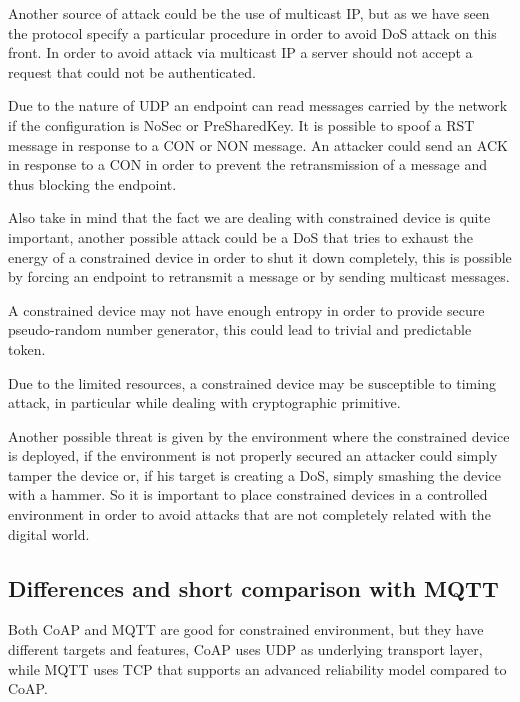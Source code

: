 	Another source of attack could be the use of multicast IP, but as we have seen the protocol specify a particular procedure in order to avoid DoS attack on this front.\newline
	In order to avoid attack via multicast IP a server should not accept a request that could not be authenticated.
	
	Due to the nature of UDP an endpoint can read messages carried by the network if the configuration is NoSec or PreSharedKey.\newline
	It is possible to spoof a RST message in response to a CON or NON message.
	An attacker could send an ACK in response to a CON in order to prevent the retransmission of a message and thus blocking the endpoint.\newline
	
	Also take in mind that the fact we are dealing with constrained device is quite important, another possible attack could be a DoS that tries to exhaust the energy of a constrained device in order to shut it down completely, this is possible by forcing an endpoint to retransmit a message or by sending multicast messages.
	
	A constrained device may not have enough entropy in order to provide secure pseudo-random number generator, this could lead to trivial and predictable token.
	
	Due to the limited resources, a constrained device may be susceptible to timing attack, in particular while dealing with cryptographic primitive.
	
	Another possible threat is given by the environment where the constrained device is deployed, if the environment is not properly secured an attacker could simply tamper the device or, if his target is creating a DoS, simply smashing the device with a hammer.\newline
	So it is important to place constrained devices in a controlled environment in order to avoid attacks that are not completely related with the digital world.
	
	\subsection{Differences and short comparison with MQTT}
	Both CoAP and MQTT are good for constrained environment, but they have different targets and features, CoAP uses UDP as underlying transport layer, while MQTT uses TCP that supports an advanced reliability model compared to CoAP.
	
